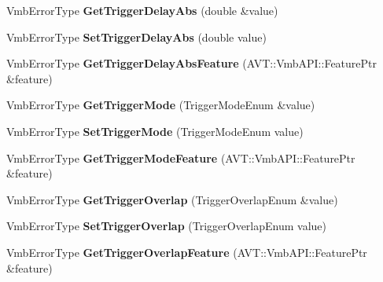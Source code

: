 \begin{DoxyCompactItemize}
\item 
\hypertarget{classMakoCamera_a057c7f796932a0207577042fd10a0801}{Vmb\-Error\-Type {\bfseries Get\-Trigger\-Delay\-Abs} (double \&value)}\label{classMakoCamera_a057c7f796932a0207577042fd10a0801}

\item 
\hypertarget{classMakoCamera_aaca1c096f889d47babc5c88b6d2f7f04}{Vmb\-Error\-Type {\bfseries Set\-Trigger\-Delay\-Abs} (double value)}\label{classMakoCamera_aaca1c096f889d47babc5c88b6d2f7f04}

\item 
\hypertarget{classMakoCamera_ad53ab3c57e66cbf1bbe4c9a9a3074ab1}{Vmb\-Error\-Type {\bfseries Get\-Trigger\-Delay\-Abs\-Feature} (A\-V\-T\-::\-Vmb\-A\-P\-I\-::\-Feature\-Ptr \&feature)}\label{classMakoCamera_ad53ab3c57e66cbf1bbe4c9a9a3074ab1}

\item 
\hypertarget{classMakoCamera_a907fa31119988288a78275ed5fe6cc25}{Vmb\-Error\-Type {\bfseries Get\-Trigger\-Mode} (Trigger\-Mode\-Enum \&value)}\label{classMakoCamera_a907fa31119988288a78275ed5fe6cc25}

\item 
\hypertarget{classMakoCamera_a67644a21ecbb79aa412e9a169aa6e9d8}{Vmb\-Error\-Type {\bfseries Set\-Trigger\-Mode} (Trigger\-Mode\-Enum value)}\label{classMakoCamera_a67644a21ecbb79aa412e9a169aa6e9d8}

\item 
\hypertarget{classMakoCamera_aafb0967603cd24dc39f58ef0aafdfff5}{Vmb\-Error\-Type {\bfseries Get\-Trigger\-Mode\-Feature} (A\-V\-T\-::\-Vmb\-A\-P\-I\-::\-Feature\-Ptr \&feature)}\label{classMakoCamera_aafb0967603cd24dc39f58ef0aafdfff5}

\item 
\hypertarget{classMakoCamera_a44cb9924db72b20afabe0b5687bb1e47}{Vmb\-Error\-Type {\bfseries Get\-Trigger\-Overlap} (Trigger\-Overlap\-Enum \&value)}\label{classMakoCamera_a44cb9924db72b20afabe0b5687bb1e47}

\item 
\hypertarget{classMakoCamera_a6ff7f9fa65fa1b99c896b6f1d1893d63}{Vmb\-Error\-Type {\bfseries Set\-Trigger\-Overlap} (Trigger\-Overlap\-Enum value)}\label{classMakoCamera_a6ff7f9fa65fa1b99c896b6f1d1893d63}

\item 
\hypertarget{classMakoCamera_a1938fbf11c7db57c3a38ba1ba6026a13}{Vmb\-Error\-Type {\bfseries Get\-Trigger\-Overlap\-Feature} (A\-V\-T\-::\-Vmb\-A\-P\-I\-::\-Feature\-Ptr \&feature)}\label{classMakoCamera_a1938fbf11c7db57c3a38ba1ba6026a13}


\end{DoxyCompactItemize}
